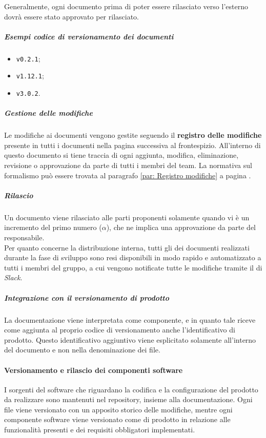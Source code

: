 		Generalmente, ogni documento prima di poter essere rilasciato verso l'esterno dovrà essere stato approvato per rilasciato.

		\subparagraph{Esempi codice di versionamento dei documenti}

		\begin{itemize}
			\item \verb!v0.2.1!;
			\item \verb!v1.12.1!;
			\item \verb!v3.0.2!.
		\end{itemize}

		\subparagraph{Gestione delle modifiche}

		Le modifiche ai documenti vengono gestite seguendo il \textbf{registro delle modifiche} presente in tutti i documenti nella pagina successiva al frontespizio. All'interno di questo documento si tiene traccia di ogni aggiunta, modifica, eliminazione, revisione o approvazione da parte di tutti i membri del team. La normativa sul formalismo può essere trovata al paragrafo \ref{par: Registro modifiche} a pagina \pageref{par: Registro modifiche}.

		\subparagraph{Rilascio}

		Un documento viene rilasciato alle parti proponenti solamente quando vi è un incremento del primo numero (\(\alpha\)), che ne implica una approvazione da parte del responsabile. \\
		Per quanto concerne la distribuzione interna, tutti gli  dei documenti realizzati durante la fase di sviluppo sono resi disponibili in modo rapido e automatizzato a tutti i membri del gruppo, a cui vengono notificate tutte le modifiche tramite il  di \textit{Slack}.

		\subparagraph{Integrazione con il versionamento di prodotto}

		La documentazione viene interpretata come componente, e in quanto tale riceve come aggiunta al proprio codice di versionamento anche l'identificativo di prodotto. Questo identificativo aggiuntivo viene esplicitato solamente all'interno del documento e non nella denominazione dei file.

	\paragraph{Versionamento e rilascio dei componenti software}

	I sorgenti del software che riguardano la codifica e la configurazione del prodotto da realizzare sono mantenuti nel repository, insieme alla documentazione. Ogni file viene versionato con un apposito storico delle modifiche, mentre ogni componente software viene versionato come  di prodotto in relazione alle funzionalità presenti e dei requisiti obbligatori implementati.


